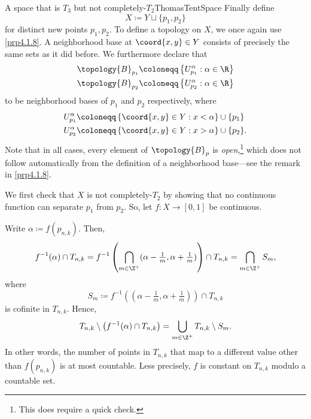 \begin{exm}{A space that is $T_3$ but not completely-$T_2$}{ThomasTentSpace}
Finally define
\begin{equation}
X\coloneqq Y\sqcup \{ p_1,p_2\}
\end{equation}
for distinct new points $p_1,p_2$.  To define a topology on $X$, we once again use \cref{prp4.1.8}.  A neighborhood base at $\coord{x,y}\in Y$ consists of precisely the same sets as it did before.  We furthermore declare that
\begin{equation}
\begin{split}
\topology{B}_{p_1} & \coloneqq \left\{ U_{p_1}^\alpha :\alpha \in \R \right\} \\
\topology{B}_{p_2} & \coloneqq \left\{ U_{p_2}^\alpha :\alpha \in \R \right\}
\end{split}
\end{equation}
to be neighborhood bases of $p_1$ and $p_2$ respectively, where
\begin{equation}
\begin{split}
U_{p_1}^\alpha & \coloneqq \left\{ \coord{x,y}\in Y:x<\alpha \right\} \cup \{ p_1\} \\
U_{p_2}^\alpha & \coloneqq \left\{ \coord{x,y}\in Y:x>\alpha \right\} \cup \{ p_2\} .
\end{split}
\end{equation}
Note that in all cases, every element of $\topology{B}_p$ is \emph{open},\footnote{This does require a quick check.} which does not follow automatically from the definition of a neighborhood base---see the remark in \cref{prp4.1.8}.

We first check that $X$ is not completely-$T_2$ by showing that no continuous function can separate $p_1$ from $p_2$.  So, let $f\colon X\rightarrow [0,1]$ be continuous.

Write $\alpha \coloneqq f(p_{n,k})$.  Then,
\begin{equation}
f^{-1}(\alpha )\cap T_{n,k}=f^{-1}\left( \bigcap _{m\in \Z ^+}(\alpha -\tfrac{1}{m},\alpha +\tfrac{1}{m})\right) \cap T_{n,k}=\bigcap _{m\in \Z ^+}S_m,
\end{equation}
where
\begin{equation}
S_m\coloneqq f^{-1}((\alpha -\tfrac{1}{m},\alpha +\tfrac{1}{m}))\cap T_{n,k}
\end{equation}
is cofinite in $T_{n,k}$.  Hence,
\begin{equation}
T_{n,k}\setminus \left( f^{-1}(\alpha )\cap T_{n,k}\right) =\bigcup _{m\in \Z ^+}T_{n,k}\setminus S_m.
\end{equation}
In other words, the number of points in $T_{n,k}$ that map to a different value other than $f(p_{n,k})$ is at most countable.  Less precisely, $f$ is constant on $T_{n,k}$ modulo a countable set.


\end{exm}
